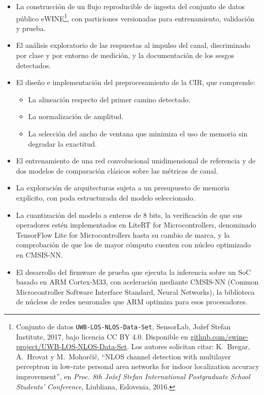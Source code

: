 \documentclass[
11pt, %
]{charter}
\begin{document}
\begin{itemize}
    \item La construcción de un flujo reproducible de ingesta del conjunto de datos público eWINE\footnote{Conjunto de datos \texttt{UWB-LOS-NLOS-Data-Set}, SensorLab, Jožef Stefan Institute, 2017, bajo licencia CC BY 4.0. Disponible en \href{https://github.com/ewine-project/UWB-LOS-NLOS-Data-Set}{github.com/ewine-project/UWB-LOS-NLOS-Data-Set}. Los autores solicitan citar: K.~Bregar, A.~Hrovat y M.~Mohorčič, ``NLOS channel detection with multilayer perceptron in low-rate personal area networks for indoor localization accuracy improvement'', en \textit{Proc. 8th Jožef Stefan International Postgraduate School Students' Conference}, Liubliana, Eslovenia, 2016.}, con particiones versionadas para entrenamiento, validación y prueba.
    \item El análisis exploratorio de las respuestas al impulso del canal, discriminado por clase y por entorno de medición, y la documentación de los sesgos detectados.
    \item El diseño e implementación del preprocesamiento de la CIR, que comprende:
        \begin{itemize}
        \item La alineación respecto del primer camino detectado.
        \item La normalización de amplitud.
        \item La selección del ancho de ventana que minimiza el uso de memoria sin degradar la exactitud.
        \end{itemize}
    \item El entrenamiento de una red convolucional unidimensional de referencia y de dos modelos de comparación clásicos sobre las métricas de canal.
    \item La exploración de arquitecturas sujeta a un presupuesto de memoria explícito, con poda estructurada del modelo seleccionado.
    \item La cuantización del modelo a enteros de 8 bits, la verificación de que sus operadores estén implementados en LiteRT for Microcontrollers, denominado TensorFlow Lite for Microcontrollers hasta su cambio de marca, y la comprobación de que los de mayor cómputo cuenten con núcleo optimizado en CMSIS-NN.
    \item El desarrollo del firmware de prueba que ejecuta la inferencia sobre un SoC basado en ARM Cortex-M33, con aceleración mediante CMSIS-NN (Common Microcontroller Software Interface Standard, Neural Networks), la biblioteca de núcleos de redes neuronales que ARM optimiza para esos procesadores.

\end{itemize}
\end{document}
